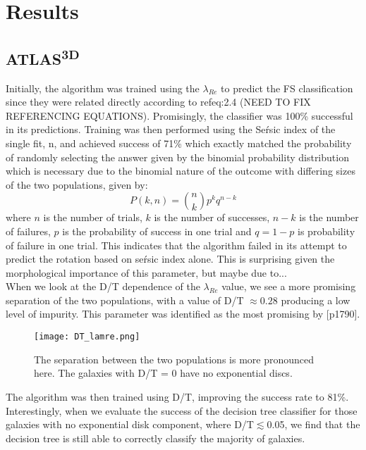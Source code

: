 \chapter{Results}

\label{ch:results}

\section{ATLAS\textsuperscript{3D}}
Initially, the algorithm was trained using the $\lambda_{Re}$ to predict the FS classification since they were related directly according to ref{eq:2.4}
(NEED TO FIX REFERENCING EQUATIONS). Promisingly, the classifier was 100\% successful in its predictions. Training was then performed using the Se\'rsic index of the single fit, n, and achieved success of 71\% which exactly matched the probability of randomly selecting the answer given by the binomial probability distribution which is necessary due to the binomial nature of the outcome with differing sizes of the two populations, given by\cite{simmons_2016}:
\begin{equation}
P(k,n) = \binom{n}{k}p^{k}q^{n-k}
\end{equation}
where $n$ is the number of trials, $k$ is the number of successes, $n-k$ is the number of failures, $p$ is the probability of success in one trial and $q=1-p$ is probability of failure in one trial. This indicates that the algorithm failed in its attempt to predict the rotation based on se\'rsic index alone. This is surprising given the morphological importance of this parameter, but maybe due to...\\
When we look at the D/T dependence of the $\lambda_{Re}$ value, we see a more promising separation of the two populations, with a value of D/T $\approx 0.28$ producing a low level of impurity. This parameter was identified as the most promising by \cite{Krajnovic2013}[p1790].
\begin{figure}[h]
	\centering
	\texttt{[image: DT\_lamre.png]}
	\caption{The separation between the two populations is more pronounced here. The galaxies with D/T = 0 have no exponential discs.
	}
	\label{fig:dtlamre}
\end{figure}
The algorithm was then trained using D/T, improving the success rate to 81\%. Interestingly, when we evaluate the success of the decision tree classifier for those galaxies with no exponential disk component, where D/T$\lesssim $0.05, we find that the decision tree is still able to correctly classify the majority of galaxies.
